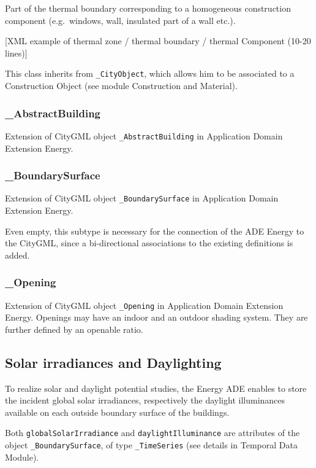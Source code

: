 \documentclass[a4paper,12pt]{article}
\begin{document}
Part of the thermal boundary corresponding to a homogeneous construction
component (e.g.~windows, wall, insulated part of a wall etc.).

{[}XML example of thermal zone / thermal boundary / thermal Component
(10-20 lines){]}

This class inherits from \texttt{\_CityObject}, which allows him to be
associated to a Construction Object (see module Construction and
Material).

\subsubsection{\_AbstractBuilding}\label{abstractbuilding}

Extension of CityGML object \texttt{\_AbstractBuilding} in Application
Domain Extension Energy.

\subsubsection{\_BoundarySurface}\label{boundarysurface}

Extension of CityGML object \texttt{\_BoundarySurface} in Application
Domain Extension Energy.

Even empty, this subtype is necessary for the connection of the ADE
Energy to the CityGML, since a bi-directional associations to the
existing definitions is added.

\subsubsection{\_Opening}\label{opening}

Extension of CityGML object \texttt{\_Opening} in Application Domain
Extension Energy. Openings may have an indoor and an outdoor shading
system. They are further defined by an openable ratio.

\subsection{Solar irradiances and
Daylighting}\label{solar-irradiances-and-daylighting}

To realize solar and daylight potential studies, the Energy ADE enables
to store the incident global solar irradiances, respectively the
daylight illuminances available on each outside boundary surface of the
buildings.

Both \texttt{globalSolarIrradiance} and \texttt{daylightIlluminance} are
attributes of the object \texttt{\_BoundarySurface}, of type
\texttt{\_TimeSeries} (see details in Temporal Data Module).
\end{document}
